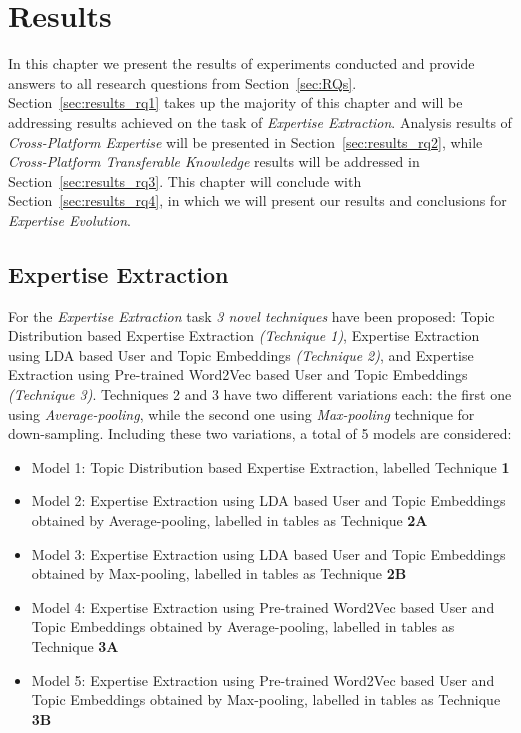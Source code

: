 \chapter{Results}

    In this chapter we present the results of experiments conducted and provide answers to all research questions from Section~\ref{sec:RQs}. Section~\ref{sec:results_rq1} takes up the majority of this chapter and will be addressing results achieved on the task of \emph{Expertise Extraction}. Analysis results of \emph{Cross-Platform Expertise} will be presented in Section~\ref{sec:results_rq2}, while \emph{Cross-Platform Transferable Knowledge} results will be addressed in Section~\ref{sec:results_rq3}. This chapter will conclude with Section~\ref{sec:results_rq4}, in which we will present our results and conclusions for \emph{Expertise Evolution}.

    \section{Expertise Extraction\label{sec:results_rq1}}
        
        For the \emph{Expertise Extraction} task \emph{3 novel techniques} have been proposed: Topic Distribution based Expertise Extraction \emph{(Technique 1)}, Expertise Extraction using LDA based User and Topic Embeddings \emph{(Technique 2)}, and Expertise Extraction using Pre-trained Word2Vec based User and Topic Embeddings \emph{(Technique 3)}. Techniques 2 and 3 have two different variations each: the first one using \emph{Average-pooling}, while the second one using \emph{Max-pooling} technique for down-sampling. Including these two variations, a total of 5 models are considered:
        
        \begin{itemize}
            \item Model 1: Topic Distribution based Expertise Extraction, labelled Technique \textbf{1} 
            \item Model 2: Expertise Extraction using LDA based User and Topic Embeddings obtained by Average-pooling, labelled in tables as Technique \textbf{2A}  
            \item Model 3: Expertise Extraction using LDA based User and Topic Embeddings obtained by Max-pooling, labelled in tables as Technique \textbf{2B}  
            \item Model 4: Expertise Extraction using Pre-trained Word2Vec based User and Topic Embeddings obtained by Average-pooling, labelled in tables as Technique \textbf{3A} 
            \item Model 5: Expertise Extraction using Pre-trained Word2Vec based User and Topic Embeddings obtained by Max-pooling, labelled in tables as Technique \textbf{3B} 
        \end{itemize}
        
